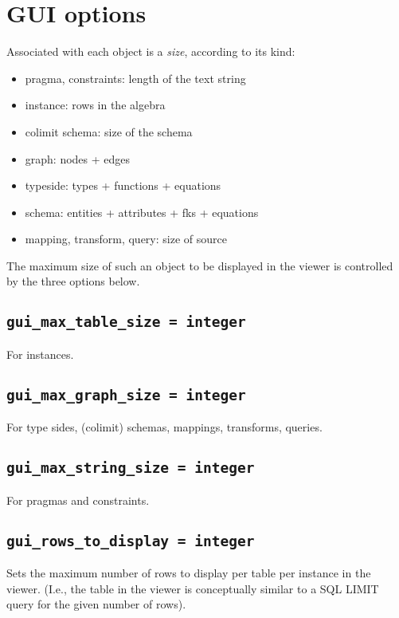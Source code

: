 \documentclass[10pt]{book}
\begin{document}
\section{GUI options}

Associated with each object is a {\it size}, according to its kind:
\begin{itemize}
\item pragma, constraints: length of the text string
\item instance: rows in the algebra
\item colimit schema: size of the schema
\item graph: nodes + edges
\item typeside: types + functions + equations
\item schema: entities + attributes + fks + equations
\item mapping, transform, query: size of source
\end{itemize}

The maximum size of such an object to be displayed in the viewer is controlled by the three options below.

\subsection{{\tt gui\_max\_table\_size = integer}}

For instances.

\subsection{{\tt gui\_max\_graph\_size = integer}}

For type sides, (colimit) schemas, mappings, transforms, queries.

\subsection{{\tt gui\_max\_string\_size = integer}}

For pragmas and constraints.

\subsection{{\tt gui\_rows\_to\_display = integer}}

Sets the maximum number of rows to display per table per instance in the viewer.  (I.e., the table in the viewer is conceptually similar to a SQL LIMIT query for the given number of rows).
\end{document}
